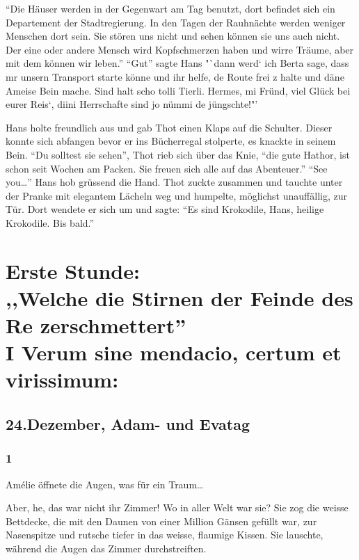 \documentclass[11pt,titlepage,a5paper]{book}
\begin{document}
"`Die Häuser werden in der Gegenwart am Tag benutzt, dort befindet sich ein Departement der Stadtregierung. In den Tagen der Rauhnächte werden weniger Menschen dort sein. Sie stören uns nicht und sehen können sie uns auch nicht. Der eine oder andere Mensch wird Kopfschmerzen haben und wirre Träume, aber mit dem können wir leben."' "`Gut"' sagte Hans  "`dann werd` ich Berta sage, dass mr unsern Transport starte könne und ihr helfe, de Route frei z halte und däne Ameise Bein mache. Sind halt scho tolli Tierli. Hermes, mi Fründ, viel Glück bei eurer Reis`, diini Herrschafte sind jo nümmi de jüngschte!"'

Hans holte freundlich aus und gab Thot einen Klaps auf die Schulter. Dieser konnte sich abfangen bevor er ins Bücherregal stolperte, es knackte in seinem Bein. "`Du solltest sie sehen"', Thot rieb sich über das Knie, "`die gute Hathor, ist schon seit Wochen am Packen. Sie freuen sich alle auf das Abenteuer."' "`See you\dots"' Hans hob grüssend die Hand. Thot zuckte zusammen und tauchte unter der Pranke mit elegantem Lächeln weg und humpelte, möglichst unauffällig, zur Tür. Dort wendete er sich um und sagte: "`Es sind Krokodile, Hans, heilige Krokodile. Bis bald."'


\part*{Erste Stunde:\\,,Welche die Stirnen der Feinde des Re zerschmettert''\\I Verum sine mendacio, certum et virissimum:}


\chapter*{24.Dezember, Adam- und Evatag}

\section*{1}

Amélie öffnete die Augen, was für ein Traum\dots

Aber, he, das war nicht ihr Zimmer! Wo in aller Welt war sie? Sie zog die weisse Bettdecke, die mit den Daunen von einer Million Gänsen gefüllt war, zur Nasenspitze und rutsche tiefer in das weisse, flaumige Kissen. Sie lauschte, während die Augen das Zimmer durchstreiften. 
\end{document}
